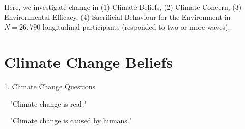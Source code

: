 \documentclass{beamer}
\begin{document}
\begin{frame}{Here, we investigate change in (1) Climate Beliefs, (2) Climate Concern, (3) Environmental Efficacy, (4) Sacrificial Behaviour for the Environment in $N = 26,790$ longitudinal participants (responded to two or more waves).}
% 
\end{frame}

\section{Climate Change Beliefs}
\begin{frame}{1. Climate Change Questions}
    

\begin{alertblock}{~}
"Climate change is real."
\end{alertblock}

\begin{alertblock}{~}
"Climate change is caused by humans."
\end{alertblock}


\end{frame}
\end{document}
